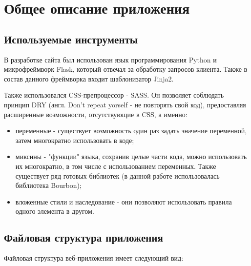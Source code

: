 \section{Общее описание приложения}
\subsection{Используемые инструменты}

В разработке сайта был использован язык программирования Python и микрофреймворк Flask, который отвечал за обработку запросов клиента. Также в состав данного фреймворка входит шаблонизатор Jinja2.

Также использовался CSS-препроцессор - SASS. Он позволяет соблюдать принцип DRY (англ. Don't repeat yorself - не повторять свой код), предоставляя расширенные возможности, отсутствующие в CSS, а именно:
\begin{itemize}
	\item переменные - существует возможность один раз задать значение переменной, затем многократно использовать в коде;
	\item миксины - "функции" языка, сохранив целые части кода, можно использовать их многократно, в том числе с использованием переменных. Также существует ряд готовых библиотек (в данной работе использовалась библиотека Bourbon);
	\item вложенные стили и наследование - они позволяют использовать правила одного элемента в другом.
\end{itemize}

\subsection{Файловая структура приложения}
Файловая структура веб-приложения имеет следующий вид:

